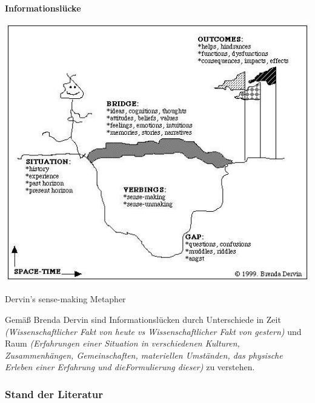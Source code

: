 \textbf{Informationslücke}
\begin{center}
	\includegraphics[scale=0.8]{SMM_MEtaphor.jpg}
	\caption{Dervin's sense-making Metapher}
\end{center}
Gemäß Brenda Dervin sind Informationslücken durch Unterschiede in Zeit \textit{(Wissenschaftlicher Fakt von heute vs Wissenschaftlicher Fakt von gestern)} und Raum \textit{(Erfahrungen einer Situation in verschiedenen Kulturen, Zusammenhängen, Gemeinschaften, materiellen Umständen, das physische Erleben einer Erfahrung und dieFormulierung dieser)} zu verstehen.\cite{dervin2003sense}

\subsubsection{Stand der Literatur}

